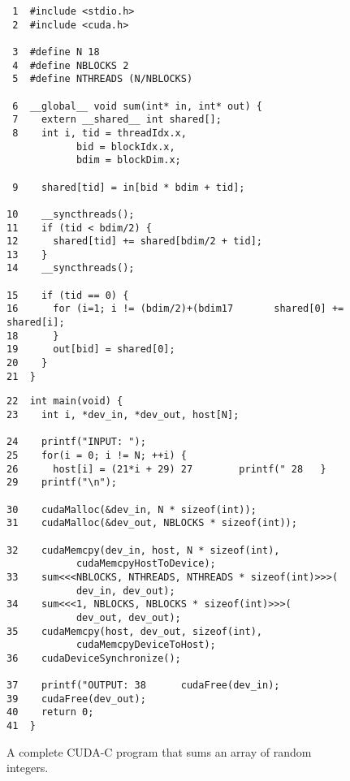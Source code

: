 \begin{figure}
\begin{minipage}[t]{2.9in}
{\scriptsize
\begin{verbatim}
 1	#include <stdio.h>
 2	#include <cuda.h>   

 3	#define N 18
 4	#define NBLOCKS 2
 5	#define NTHREADS (N/NBLOCKS)
   
 6	__global__ void sum(int* in, int* out) {
 7	  extern __shared__ int shared[];
 8	  int i, tid = threadIdx.x, 
            bid = blockIdx.x, 
            bdim = blockDim.x;
   
 9	  shared[tid] = in[bid * bdim + tid];

10	  __syncthreads();
11	  if (tid < bdim/2) {
12	    shared[tid] += shared[bdim/2 + tid];
13	  }
14	  __syncthreads();
   
15	  if (tid == 0) {
16	    for (i=1; i != (bdim/2)+(bdim17	      shared[0] += shared[i];
18	    }
19	    out[bid] = shared[0];
20	  }
21	}
\end{verbatim}
}
\end{minipage}
\begin{minipage}[t]{2.2in}
{\scriptsize
\begin{verbatim}
22	int main(void) {
23	  int i, *dev_in, *dev_out, host[N];

24	  printf("INPUT: ");
25	  for(i = 0; i != N; ++i) {
26	    host[i] = (21*i + 29) 27	    printf(" 28	  }
29	  printf("\n");
 
30	  cudaMalloc(&dev_in, N * sizeof(int));
31	  cudaMalloc(&dev_out, NBLOCKS * sizeof(int));
   
32	  cudaMemcpy(dev_in, host, N * sizeof(int), 
            cudaMemcpyHostToDevice);
33	  sum<<<NBLOCKS, NTHREADS, NTHREADS * sizeof(int)>>>(
            dev_in, dev_out);
34	  sum<<<1, NBLOCKS, NBLOCKS * sizeof(int)>>>(
            dev_out, dev_out);
35	  cudaMemcpy(host, dev_out, sizeof(int), 
            cudaMemcpyDeviceToHost);
36	  cudaDeviceSynchronize();
   
37	  printf("OUTPUT: 38	  cudaFree(dev_in);
39	  cudaFree(dev_out);
40	  return 0;
41	}
\end{verbatim}
}
\end{minipage}
\caption{A complete CUDA-C program that sums an array of random integers.}
\label{fig:sum}
\end{figure}

\renewcommand{\paragraph}[1]{\vspace{0.5ex}{\bf \noindent #1}}

